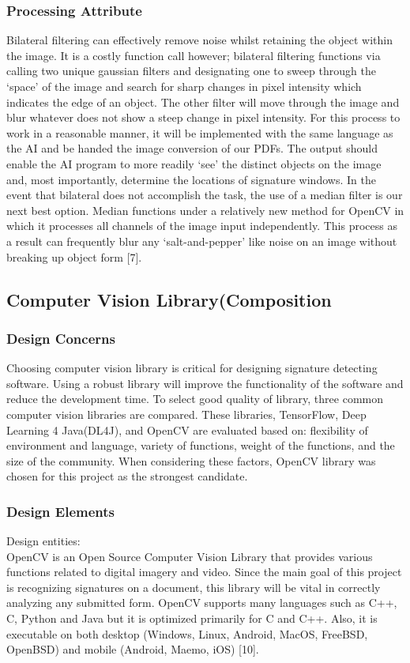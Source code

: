 \documentclass[onecolumn, draftclsnofoot,10pt, compsoc]{IEEEtran}
\begin{document}
\subsubsection{Processing Attribute}
Bilateral filtering can effectively remove noise whilst retaining the object within the image. It is a costly function call however; bilateral filtering functions via calling two unique gaussian filters and designating one to sweep through the ‘space’ of the image and search for sharp changes in pixel intensity which indicates the edge of an object. The other filter will move through the image and blur whatever does not show a steep change in pixel intensity. For this process to work in a reasonable manner, it will be implemented with the same language as the AI and be handed the image conversion of our PDFs. The output should enable the AI program to more readily ‘see’ the distinct objects on the image and, most importantly, determine the locations of signature windows. In the event that bilateral does not accomplish the task, the use of a median filter is our next best option. Median functions under a relatively new method for OpenCV in which it processes all channels of the image input independently. This process as a result can frequently blur any ‘salt-and-pepper’ like noise on an image without breaking up object form [7].

\subsection{Computer Vision Library(Composition}
\subsubsection{Design Concerns}
Choosing computer vision library is critical for designing signature detecting software. Using a robust library will improve the functionality of the software and reduce the development time. To select good quality of library, three common computer vision libraries are compared. These libraries, TensorFlow, Deep Learning 4 Java(DL4J), and OpenCV are evaluated based on: flexibility of environment and language, variety of functions, weight of the functions, and the size of the community. When considering these factors, OpenCV library was chosen for this project as the strongest candidate.

\subsubsection{Design Elements}
Design entities: \\
OpenCV is an Open Source Computer Vision Library that provides various functions related to digital imagery and video. Since the main goal of this project is recognizing signatures on a document, this library will be vital in correctly analyzing any submitted form. OpenCV supports many languages such as C++, C, Python and Java but it is optimized primarily for C and C++.  Also, it is executable on both desktop (Windows, Linux, Android, MacOS, FreeBSD, OpenBSD) and mobile (Android, Maemo, iOS) [10].\\
\end{document}
